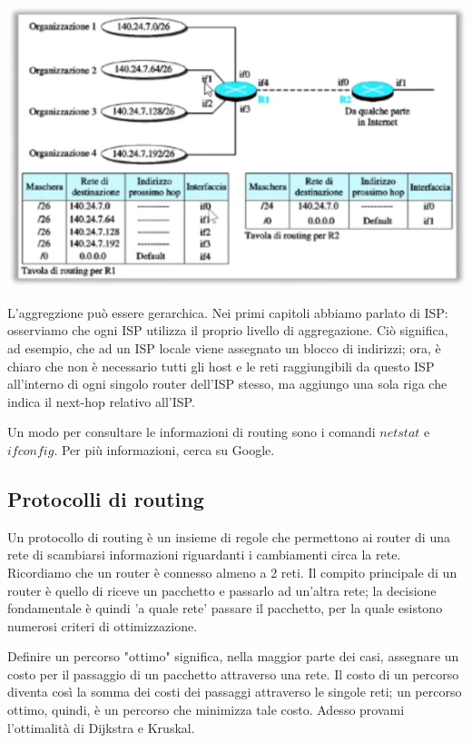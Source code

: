         \begin{center}
            \includegraphics[scale=0.5]{images/Aggregazione.png}
        \end{center}
        
        L'aggregzione può essere gerarchica. Nei primi capitoli abbiamo parlato di ISP: osserviamo che ogni ISP utilizza il proprio livello di aggregazione. Ciò significa, ad esempio, che ad un ISP locale viene assegnato un blocco di indirizzi; ora, è chiaro che non è necessario tutti gli host e le reti raggiungibili da questo ISP all'interno di ogni singolo router dell'ISP stesso, ma aggiungo una sola riga che indica il next-hop relativo all'ISP.
        
        \vspace{3mm}
        
        Un modo per consultare le informazioni di routing sono i comandi $netstat$ e $ifconfig$. Per più informazioni, cerca su Google.
        
    \subsection{Protocolli di routing}
    
        Un protocollo di routing è un insieme di regole che permettono ai router di una rete di scambiarsi informazioni riguardanti i cambiamenti circa la rete. Ricordiamo che un router è connesso almeno a 2 reti. Il compito principale di un router è quello di riceve un pacchetto e passarlo ad un'altra rete; la decisione fondamentale è quindi 'a quale rete' passare il pacchetto, per la quale esistono numerosi criteri di ottimizzazione.
        
        Definire un percorso "ottimo" significa, nella maggior parte dei casi, assegnare un costo per il passaggio di un pacchetto attraverso una rete. Il costo di un percorso diventa così la somma dei costi dei passaggi attraverso le singole reti; un percorso ottimo, quindi, è un percorso che minimizza tale costo. Adesso provami l'ottimalità di Dijkstra e Kruskal.
        
